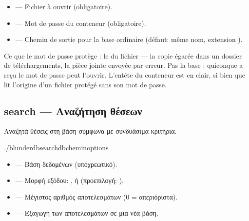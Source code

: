 \documentclass[letterpaper,10pt,greek]{sphinxmanual}
\begin{document}
\sphinxAtStartPar
{}
\begin{itemize}
\item {} 
\sphinxAtStartPar
{} — Fichier  à ouvrir (obligatoire).

\item {} 
\sphinxAtStartPar
{} — Mot de passe du conteneur (obligatoire).

\item {} 
\sphinxAtStartPar
{} — Chemin de sortie pour la base ordinaire (défaut: même nom,
extension ).

\end{itemize}

\sphinxAtStartPar
Ce que le mot de passe protège : le  du fichier — la copie égarée
dans un dossier de téléchargements, la pièce jointe envoyée par erreur. Pas la
base : quiconque a reçu le mot de passe peut l’ouvrir. L’en\sphinxhyphen{}tête du conteneur
est en clair, si bien que  lit l’origine d’un fichier
protégé sans son mot de passe.


\subsection{search — Αναζήτηση θέσεων}
\label{\detokenize{cli:search-rechercher-des-positions}}
\sphinxAtStartPar
Αναζητά θέσεις στη βάση σύμφωνα με συνδυάσιμα κριτήρια.

\begin{sphinxVerbatim}[commandchars=\\\{\}]
./blunderdbsearch\PYGZhy{}\PYGZhy{}db\PYGZlt{}chemin\PYGZgt{}\PYG{o}{[}options\PYG{o}{]}
\end{sphinxVerbatim}

\sphinxAtStartPar
{}
\begin{itemize}
\item {} 
\sphinxAtStartPar
{} — Βάση δεδομένων (υποχρεωτικό).

\item {} 
\sphinxAtStartPar
{} — Μορφή εξόδου: ,  ή  (προεπιλογή: ).

\item {} 
\sphinxAtStartPar
{} — Μέγιστος αριθμός αποτελεσμάτων (0 = απεριόριστα).

\item {} 
\sphinxAtStartPar
{} — Εξαγωγή των αποτελεσμάτων σε μια νέα βάση.

\end{itemize}
\end{document}

